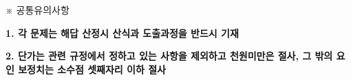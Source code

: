 ※ 공통유의사항 \par
\textbf{1. 각 문제는 해답 산정시 산식과 도출과정을 반드시 기재} \par
\textbf{2. 단가는 관련 규정에서 정하고 있는 사항을 제외하고 천원미만은 절사, 그 밖의 요인 보정치는 소수점 셋째자리 이하 절사} \par

